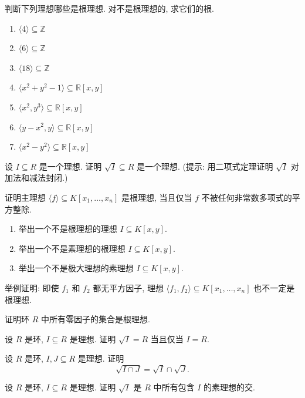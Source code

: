 \BookExerciseHeading
\begin{BookExercises}
  \item\label{ex:compute-sample-radicals} 判断下列理想哪些是根理想. 对不是根理想的, 求它们的根.
    \begin{enumerate}[label=(\alph*)]
      \item $\langle4\rangle\subseteq\mathbb{Z}$
      \item $\langle6\rangle\subseteq\mathbb{Z}$
      \item $\langle18\rangle\subseteq\mathbb{Z}$
      \item $\langle x^{2}+y^{2}-1\rangle\subseteq\mathbb{R}[x,y]$
      \item $\langle x^{2},y^{3}\rangle\subseteq\mathbb{R}[x,y]$
      \item $\langle y-x^{2},y\rangle\subseteq\mathbb{R}[x,y]$
      \item $\langle x^{2}-y^{2}\rangle\subseteq\mathbb{R}[x,y]$
    \end{enumerate}
  \item\label{ex:radical-is-an-ideal} 设 $I\subseteq R$ 是一个理想. 证明 $\sqrt{I}\subseteq R$ 是一个理想. (提示: 用二项式定理证明 $\sqrt{I}$ 对加法和减法封闭.)
  \item\label{ex:principal-radical-iff-square-free} 证明主理想 $\langle f\rangle\subseteq K[x_{1},\ldots,x_{n}]$ 是根理想, 当且仅当 $f$ 不被任何非常数多项式的平方整除.
  \item\label{ex:strict-hierarchy-of-ideals}
    \begin{enumerate}[label=(\alph*)]
      \item 举出一个不是根理想的理想 $I\subseteq K[x,y]$.
      \item 举出一个不是素理想的根理想 $I\subseteq K[x,y]$.
      \item 举出一个不是极大理想的素理想 $I\subseteq K[x,y]$.
    \end{enumerate}
  \item\label{ex:square-free-generators-need-not-give-radical} 举例证明: 即使 $f_{1}$ 和 $f_{2}$ 都无平方因子, 理想 $\langle f_{1},f_{2}\rangle\subseteq K[x_{1},\ldots,x_{n}]$ 也不一定是根理想.
  \item\label{ex:zero-divisors-as-radical-ideal} 证明环 $R$ 中所有零因子的集合是根理想.
  \item\label{ex:unit-ideal-iff-radical-unit-ideal} 设 $R$ 是环, $I\subseteq R$ 是理想. 证明 $\sqrt{I}=R$ 当且仅当 $I=R$.
  \item\label{ex:radical-of-intersection} 设 $R$ 是环, $I,J\subseteq R$ 是理想. 证明
    \[
      \sqrt{I\cap J}=\sqrt{I}\cap\sqrt{J}.
    \]
  \item\label{ex:radical-is-intersection-of-primes} 设 $R$ 是环, $I\subseteq R$ 是理想. 证明 $\sqrt{I}$ 是 $R$ 中所有包含 $I$ 的素理想的交.
\end{BookExercises}

